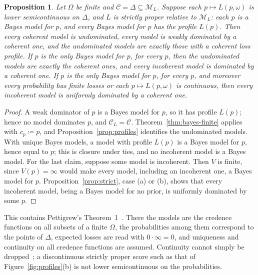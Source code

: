 \documentclass[11pt]{article}
\newtheorem{proposition}[theorem]{Proposition}
\theoremstyle{definition}
\theoremstyle{remark}
\newcommand{\M}{\mathcal M}
\newcommand{\C}{\mathcal C}
\begin{document}
\begin{proposition}\label{prop:proper}
Let $\Omega$ be finite and $\C=\Delta\subseteq\M_L$. Suppose each $p\mapsto L(p,\omega)$ is lower semicontinuous on $\Delta$, and $L$ is \emph{strictly proper relative to $\M_L$}: each $p$ is a Bayes model for $p$, and every Bayes model for $p$ has the profile $L(p)$. Then every coherent model is undominated, every model is weakly dominated by a coherent one, and the undominated models are exactly those with a coherent loss profile. If $p$ is the only Bayes model for $p$, for every $p$, then the undominated models are exactly the coherent ones, and every incoherent model is dominated by a coherent one. If $p$ is the only Bayes model for $p$, for every $p$, and moreover every probability has finite losses or each $p\mapsto L(p,\omega)$ is continuous, then every incoherent model is uniformly dominated by a coherent one.
\end{proposition}
\begin{proof}
A weak dominator of $p$ is a Bayes model for $p$, so it has profile $L(p)$; hence no model dominates $p$, and $\C_L=\C$. Theorem~\ref{thm:bayes-finite} applies with $c_p\coloneqq p$, and Proposition~\ref{prop:profiles} identifies the undominated models. With unique Bayes models, a model with profile $L(p)$ is a Bayes model for $p$, hence equal to $p$; this is closure under ties, and no incoherent model is a Bayes model. For the last claim, suppose some model is incoherent. Then $V$ is finite, since $V(p)=\infty$ would make every model, including an incoherent one, a Bayes model for $p$. Proposition~\ref{prop:strict}, case (a) or (b), shows that every incoherent model, being a Bayes model for no prior, is uniformly dominated by some $p$.
\end{proof}

This contains Pettigrew's Theorem~1~\cite{Pettigrew}. There the models are the credence functions on all subsets of a finite $\Omega$, the probabilities among them correspond to the points of $\Delta$, expected losses are read with $0\cdot\infty=0$, and uniqueness and continuity on all credence functions are assumed. Continuity cannot simply be dropped~\cite{SSK09}; a discontinuous strictly proper score such as that of Figure~\ref{fig:profiles}(b) is not lower semicontinuous on the probabilities.
\end{document}
